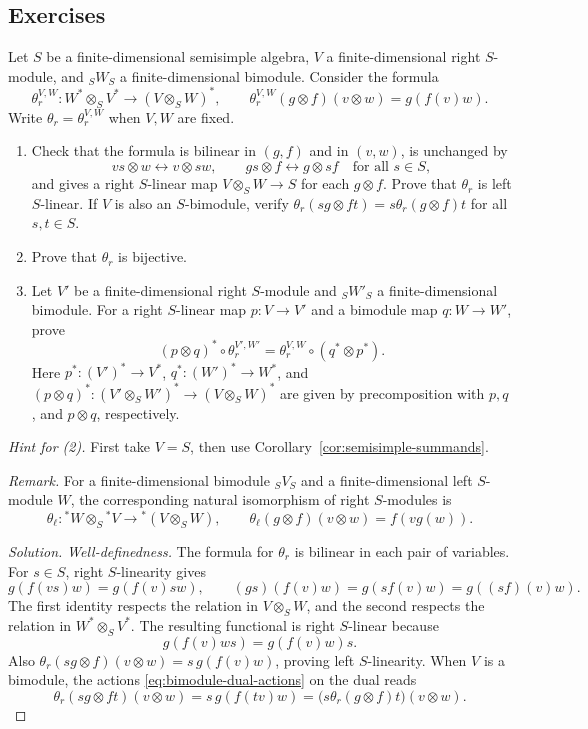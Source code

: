 \subsection{Exercises}

\begin{advanced}
\begin{exercise}\label{ex:tensor-duality-proof}
Let $S$ be a finite-dimensional semisimple algebra, $V$ a finite-dimensional right $S$-module, and ${}_SW_S$ a finite-dimensional bimodule.
Consider the formula
\[
\theta_r^{V,W}:W^*\otimes_S V^*\longrightarrow(V\otimes_S W)^*,
\qquad \theta_r^{V,W}(g\otimes f)(v\otimes w)=g(f(v)w).
\]
Write $\theta_r=\theta_r^{V,W}$ when $V,W$ are fixed.
\begin{enumerate}
\item Check that the formula is bilinear in $(g,f)$ and in $(v,w)$, is unchanged by
\[
vs\otimes w\longleftrightarrow v\otimes sw,
\qquad gs\otimes f\longleftrightarrow g\otimes sf
\quad\text{for all }s\in S,
\]
and gives a right $S$-linear map $V\otimes_S W\to S$ for each $g\otimes f$.
Prove that $\theta_r$ is left $S$-linear.
If $V$ is also an $S$-bimodule, verify $\theta_r(sg\otimes ft)=s\theta_r(g\otimes f)t$ for all $s,t\in S$.
\item Prove that $\theta_r$ is bijective.
\item Let $V'$ be a finite-dimensional right $S$-module and ${}_SW'_S$ a finite-dimensional bimodule.
For a right $S$-linear map $p:V\to V'$ and a bimodule map $q:W\to W'$, prove
\[
(p\otimes q)^*\circ\theta_r^{V',W'}
=\theta_r^{V,W}\circ(q^*\otimes p^*).
\]
Here $p^*:(V')^*\to V^*$, $q^*:(W')^*\to W^*$, and $(p\otimes q)^*:(V'\otimes_S W')^*\to(V\otimes_S W)^*$ are given by precomposition with $p,q$, and $p\otimes q$, respectively.
\end{enumerate}
\emph{Hint for (2).} First take $V=S$, then use Corollary~\ref{cor:semisimple-summands}.

\emph{Remark.} For a finite-dimensional bimodule ${}_SV_S$ and a finite-dimensional left $S$-module $W$, the corresponding natural isomorphism of right $S$-modules is
\[
\theta_\ell:{}^*W\otimes_S{}^*V\longrightarrow{}^*(V\otimes_S W),
\qquad \theta_\ell(g\otimes f)(v\otimes w)=f(vg(w)).
\]
\end{exercise}

\begin{hidden}
\begin{proof}[Solution]
\emph{Well-definedness.}
The formula for $\theta_r$ is bilinear in each pair of variables.
For $s\in S$, right $S$-linearity gives
\[
g(f(vs)w)=g(f(v)sw),\qquad
(gs)(f(v)w)=g(sf(v)w)=g((sf)(v)w).
\]
The first identity respects the relation in $V\otimes_S W$, and the second respects the relation in $W^*\otimes_S V^*$.
The resulting functional is right $S$-linear because
\[
g(f(v)ws)=g(f(v)w)s.
\]
Also $\theta_r(sg\otimes f)(v\otimes w)=s\,g(f(v)w)$, proving left $S$-linearity.
When $V$ is a bimodule, the actions  \eqref{eq:bimodule-dual-actions} on the dual reads
\[
\theta_r(sg\otimes ft)(v\otimes w)
=s\,g(f(tv)w)
=\bigl(s\theta_r(g\otimes f)t\bigr)(v\otimes w).
\]


\end{proof}
\end{hidden}
\end{advanced}
